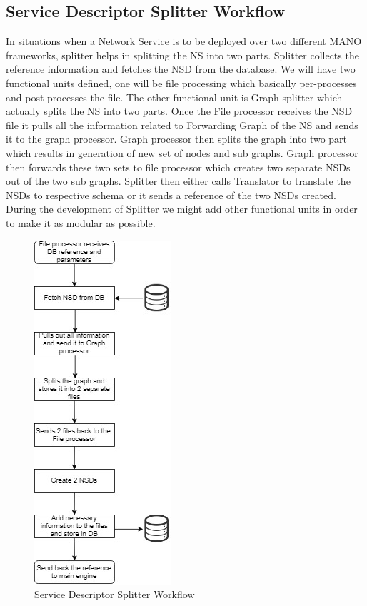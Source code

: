 \subsection{Service Descriptor Splitter Workflow}
In situations when a Network Service is to be deployed over two different MANO frameworks, splitter helps in splitting the NS into two parts. Splitter collects the reference information and fetches the NSD from the database. We will have two functional units defined, one will be file processing which basically per-processes and post-processes the file. The other functional unit is Graph splitter which actually splits the NS into two parts. Once the File processor receives the NSD file it pulls all the information related to Forwarding Graph of the NS and sends it to the graph processor. Graph processor then splits the graph into two part which results in generation of new set of nodes and sub graphs. Graph processor then forwards these two sets to file processor which creates two separate NSDs out of the two sub graphs. Splitter then either calls Translator to translate the NSDs to respective schema or it sends a reference of the two NSDs created. During the development of Splitter we might add other functional units in order to make it as modular as possible.

\begin{figure}
	\centering
	\includegraphics[width=0.5\linewidth]{figures/SDS_Workflow}
	\caption{Service Descriptor Splitter Workflow}
	\label{fig:sdsworkflow}
\end{figure}


